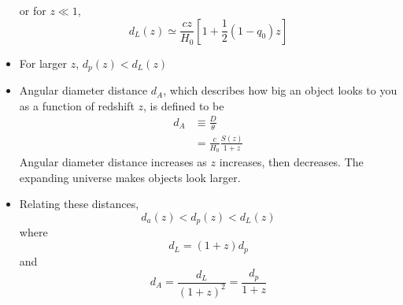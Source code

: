 \documentclass{book}
\begin{document}
\begin{itemize}
          or for $z \ll 1$,
          \begin{equation*}
              d_L (z) \simeq \frac{c z}{H_0} \left[ 1 + \frac{1}{2} (1 - q_0)z\right] \tag{C\&O 29.185}
          \end{equation*}
    \item For larger $z$, $d_p (z) < d_L (z)$
    \item Angular diameter distance $d_A$, which describes how big an object looks to you as a function of redshift $z$, is defined to be
          \begin{align*}
              d_A & \equiv \frac{D}{\theta} \tag{C\&O 29.189}            \\
                  & = \frac{c}{H_0} \frac{S(z)}{1 + z} \tag{C\&O 29.191}
          \end{align*}
          Angular diameter distance increases as $z$ increases, then decreases. The expanding universe makes objects look larger.
    \item Relating these distances,
          \begin{equation*}
              d_a(z) < d_p(z) < d_L (z)
          \end{equation*}
          where
          \begin{equation*}
              d_L = (1+z) d_p
          \end{equation*}
          and
          \begin{equation*}
              d_A = \frac{d_L}{(1+z)^2} = \frac{d_p}{1+z}
          \end{equation*}
\end{itemize}

\backmatter
\end{document}
